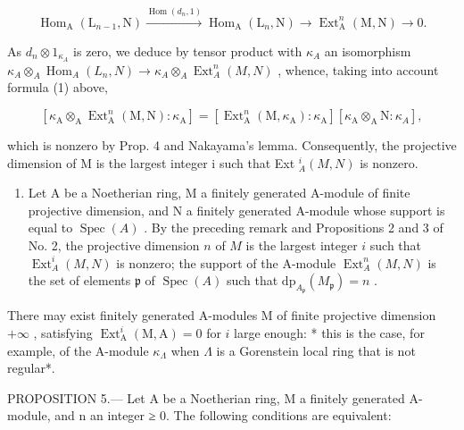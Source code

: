 \[
\operatorname{Hom} _ {\mathrm{A}} \left(\mathrm{L} _ {n - 1}, \mathrm{N}\right) \xrightarrow {\operatorname{Hom} \left(d _ {n} , 1\right)} \operatorname{Hom} _ {\mathrm{A}} \left(\mathrm{L} _ {n}, \mathrm{N}\right) \longrightarrow \operatorname{Ext} _ {\mathrm{A}} ^ {n} (\mathrm{M}, \mathrm{N}) \rightarrow 0.
\]

As \(d_n \otimes 1_{\kappa_A}\) is zero, we deduce by tensor product with \(\kappa_A\) an isomorphism \(\kappa_A \otimes_A \operatorname{Hom}_A(L_n, N) \longrightarrow \kappa_A \otimes_A \operatorname{Ext}_A^n(M, N)\) , whence, taking into account formula (1) above,

\[
\left[ \kappa_ {\mathrm{A}} \otimes_ {\mathrm{A}} \operatorname{Ext} _ {\mathrm{A}} ^ {n} (\mathrm{M}, \mathrm{N}): \kappa_ {\mathrm{A}} \right] = \left[ \operatorname{Ext} _ {\mathrm{A}} ^ {n} (\mathrm{M}, \kappa_ {\mathrm{A}}): \kappa_ {\mathrm{A}} \right] \left[ \kappa_ {\mathrm{A}} \otimes_ {\mathrm{A}} \mathrm{N}: \kappa_ {A} \right],
\]

which is nonzero by Prop. 4 and Nakayama’s lemma. Consequently, the projective dimension of M is the largest integer i such that Ext \(_{A}^{i}(M,N)\) is nonzero.

\begin{enumerate}
\def\labelenumi{\arabic{enumi})}
\setcounter{enumi}{2}
\tightlist
\item
  Let A be a Noetherian ring, M a finitely generated A-module of finite projective dimension, and N a finitely generated A-module whose support is equal to \(\operatorname{Spec}(A)\) . By the preceding remark and Propositions 2 and 3 of No. 2, the projective dimension \(n\) of \(M\) is the largest integer \(i\) such that \(\operatorname{Ext}_{A}^{i}(M,N)\) is nonzero; the support of the A-module \(\operatorname{Ext}_{A}^{n}(M,N)\) is the set of elements \(\mathfrak{p}\) of \(\operatorname{Spec}(A)\) such that \(\mathrm{dp}_{A_{\mathfrak{p}}}(M_{\mathfrak{p}})=n\) .
\end{enumerate}

There may exist finitely generated A-modules M of finite projective dimension \(+\infty\) , satisfying \(\operatorname{Ext}_{\mathrm{A}}^{i}(\mathrm{M},\mathrm{A})=0\) for \(i\) large enough: * this is the case, for example, of the A-module \(\kappa_{\Lambda}\) when \(\Lambda\) is a Gorenstein local ring that is not regular*.

PROPOSITION 5.--- Let A be a Noetherian ring, M a finitely generated A-module, and n an integer ≥ 0. The following conditions are equivalent:

